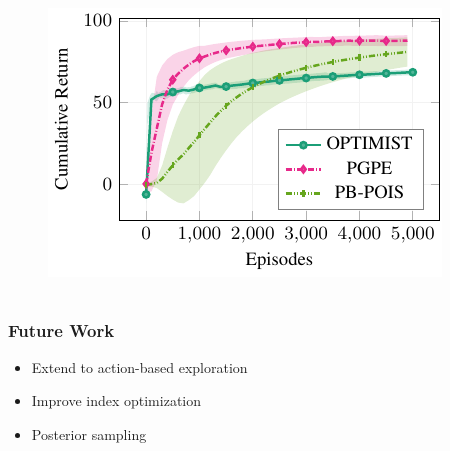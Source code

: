 \documentclass[aspectratio=169, table]{beamer}
\begin{document}
\begin{frame}
\begin{columns}
\begin{column}{.5\textwidth}
\begin{overlayarea}{\textwidth}{\textheight}
{\begin{figure}
			\includegraphics[width=\textwidth]{mc.pdf}
		\end{figure}
	}
	\end{overlayarea}
	\end{column}
\end{columns}
\end{frame}

\begin{frame}
\frametitle{Future Work}
\begin{itemize}
	\setlength{\itemsep}{20pt}
	\item<1-> Extend to action-based exploration
	\item<2-> Improve index optimization
	\item<3-> Posterior sampling~\citep{thompson1933likelihood}
\end{itemize}
\end{frame}
\end{document}
